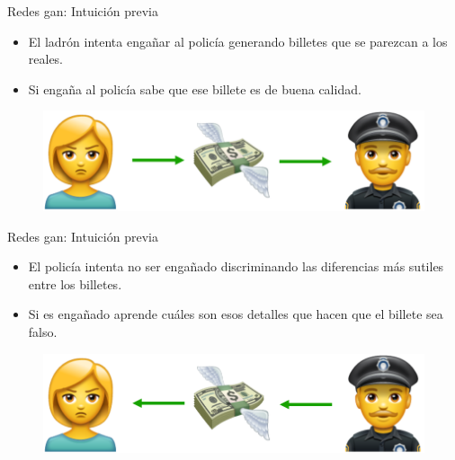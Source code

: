 \begin{frame}{Redes \gls{gan}: Intuición previa}
    
    \begin{itemize}
        \item El ladrón intenta \alert{engañar} al policía generando billetes que se \alert{parezcan} a los reales.
        \item Si engaña al policía sabe que ese billete es de \alert{buena calidad}.
    \end{itemize}
    
    \begin{figure}
        \centering
        \includegraphics[width=\textwidth]{Slides/figures/GAN/PoliciaLadronBilletes 2.PNG}
    \end{figure}
    
\end{frame}

\begin{frame}{Redes \gls{gan}: Intuición previa}
    
    \begin{itemize}
        \item El policía intenta no ser engañado \alert{discriminando} las diferencias \alert{más sutiles} entre los billetes.
        \item Si es \alert{engañado} aprende cuáles son esos \alert{detalles} que hacen que el billete sea falso.
    \end{itemize}
    
    \begin{figure}
        \centering
        \includegraphics[width=\textwidth]{Slides/figures/GAN/PoliciaLadronBilletes 3.PNG}
    \end{figure}
    
\end{frame}

